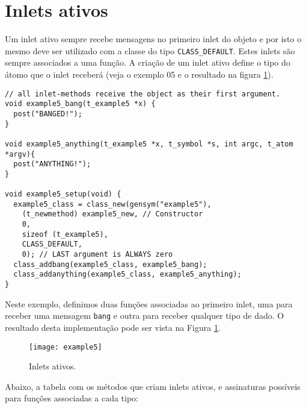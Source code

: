 \section{Inlets ativos}

Um inlet ativo sempre recebe mensagens no primeiro inlet do objeto e por isto
o mesmo deve ser utilizado com a classe do tipo \texttt{CLASS\_DEFAULT}.
Estes inlets são sempre associados a uma função.
A criação de um inlet ativo define o tipo do átomo que o inlet receberá (veja o
exemplo 05 e o resultado na figura \ref{fig:inlet-ativo}).

\begin{lstlisting}[caption=Exemplo de objeto com inlet ativo]
// all inlet-methods receive the object as their first argument.
void example5_bang(t_example5 *x) { 
  post("BANGED!");
}

void example5_anything(t_example5 *x, t_symbol *s, int argc, t_atom *argv){
  post("ANYTHING!");
}

void example5_setup(void) {
  example5_class = class_new(gensym("example5"),
    (t_newmethod) example5_new, // Constructor
    0, 
    sizeof (t_example5),
    CLASS_DEFAULT,
    0); // LAST argument is ALWAYS zero
  class_addbang(example5_class, example5_bang);
  class_addanything(example5_class, example5_anything);
}
\end{lstlisting}

Neste exemplo, definimos duas funções associadas ao primeiro inlet, uma para
receber uma mensagem \texttt{bang} e outra para receber qualquer tipo de dado.
O resultado desta implementação pode ser vista na Figura \ref{fig:inlet-ativo}.

\begin{figure}[h!]
\centering
\texttt{[image: example5]}
\caption{Inlets ativos.}
\label{fig:inlet-ativo}
\end{figure}

Abaixo, a tabela com os métodos que criam inlets ativos,
e assinaturas possíveis para funções associadas a cada tipo:


